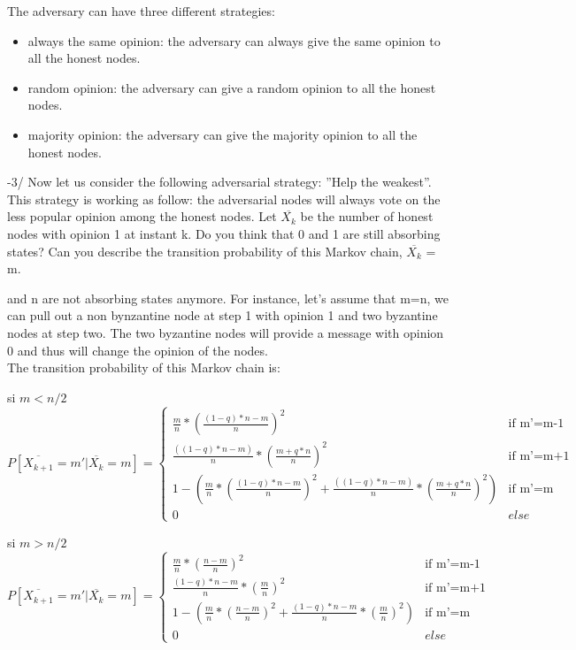 \documentclass[11pt]{article}
\begin{document}
\vspace{5mm}

\noindent The adversary can have three different strategies:
\begin{itemize}
    \item always the same opinion: the adversary can always give the same opinion to all the honest nodes.
    \item random opinion: the adversary can give a random opinion to all the honest nodes.
    \item majority opinion: the adversary can give the majority opinion to all the honest nodes.
\end{itemize}

\vspace{5mm}

-3/ Now let us consider the following adversarial strategy: ”Help the weakest”. This strategy is
working as follow: the adversarial nodes will always vote on the less popular opinion among
the honest nodes. Let $\overline{X_{k}}$ be the number of honest nodes with opinion 1 at instant k. Do you
think that 0 and 1 are still absorbing states? Can you describe the transition probability of this
Markov chain, $\overline{X_{k}}$ = m.

\vspace{5mm}

 and n are not absorbing states anymore. For instance, let's assume that m=n, we can pull out a non bynzantine node at step 1 
with opinion 1 and two byzantine nodes at step two. The two byzantine nodes will provide a message with opinion 0 and thus 
will change the opinion of the nodes. \\
The transition probability of this Markov chain is:

si $m < n/2$
\begin{equation}
    P[\overline{X_{k+1}} = m'|\overline{X_{k}} = m]=
    \begin{cases}
        \frac{m}{n}*(\frac{(1-q)*n-m}{n})^{2} & \text{if m'=m-1}\\
        \frac{((1-q)*n-m)}{n}*(\frac{m+ q*n}{n})^{2} & \text{if m'=m+1}\\
        1 - (\frac{m}{n}*(\frac{(1-q)*n-m}{n})^{2} + \frac{((1-q)*n-m)}{n}*(\frac{m+ q*n}{n})^{2}) & \text{if m'=m}\\
        0 & else
    \end{cases}
\end{equation}

si $m > n/2$
\begin{equation}
    P[\overline{X_{k+1}} = m'|\overline{X_{k}} = m]=
    \begin{cases}
        \frac{m}{n}*(\frac{n-m}{n})^{2} & \text{if m'=m-1}\\
        \frac{(1-q)*n-m}{n}*(\frac{m}{n})^{2} & \text{if m'=m+1}\\
        1 - (\frac{m}{n}*(\frac{n-m}{n})^{2} + \frac{(1-q)*n-m}{n}*(\frac{m}{n})^{2}) & \text{if m'=m}\\
        0 & else
    \end{cases}
\end{equation}
\end{document}
